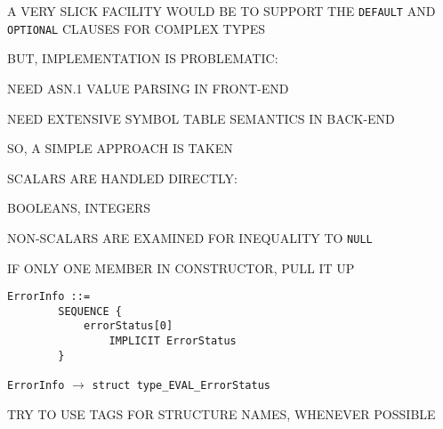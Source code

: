 \begin{bwslide}

\begin{nrtc}
\item	A VERY SLICK FACILITY WOULD BE TO SUPPORT THE \verb"DEFAULT" AND
	\verb"OPTIONAL" CLAUSES FOR COMPLEX TYPES

\item	BUT, IMPLEMENTATION IS PROBLEMATIC:
    \begin{nrtc}
    \item	NEED ASN.1 VALUE PARSING IN FRONT-END

    \item	NEED EXTENSIVE SYMBOL TABLE SEMANTICS IN BACK-END
    \end{nrtc}

\item	SO, A SIMPLE APPROACH IS TAKEN
    \begin{nrtc}
    \item	SCALARS ARE HANDLED DIRECTLY:
	\begin{nrtc}
	\item	BOOLEANS, INTEGERS
	\end{nrtc}

    \item	NON-SCALARS ARE EXAMINED FOR INEQUALITY TO \verb"NULL"
    \end{nrtc}
\end{nrtc}
\end{bwslide}


\begin{bwslide}

\begin{nrtc}
\item	IF ONLY ONE MEMBER IN CONSTRUCTOR, PULL IT UP
\begin{verbatim}
ErrorInfo ::=
        SEQUENCE {
            errorStatus[0]
                IMPLICIT ErrorStatus
        }
\end{verbatim}
\verb"ErrorInfo" $\rightarrow$ \verb"struct type_EVAL_ErrorStatus"

\item	TRY TO USE TAGS FOR STRUCTURE NAMES, WHENEVER POSSIBLE
\end{nrtc}
\end{bwslide}


